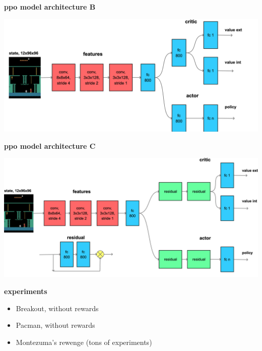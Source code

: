 \documentclass[xcolor=dvipsnames]{beamer}
\begin{document}
\begin{frame}{\bf ppo model architecture B}

\centering
\includegraphics[scale=0.1]{../diagrams/rnd/modelppob.png}

\end{frame}


\begin{frame}{\bf ppo model architecture C}

\centering
\includegraphics[scale=0.12]{../diagrams/rnd/modelppoc.png}

\end{frame}



\begin{frame}{\bf experiments}

  \begin{itemize}
    \item Breakout, without rewards
    \item Pacman, without rewards
    \item Montezuma's rewenge (tons of experiments)
  \end{itemize}

\end{frame}
\end{document}
